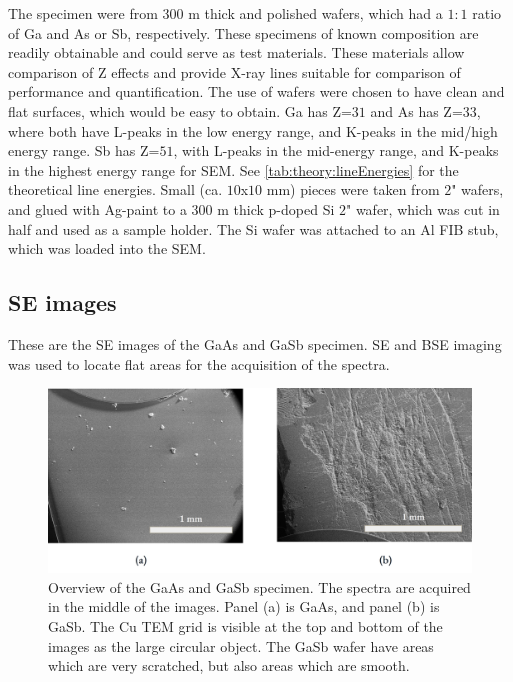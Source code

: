 The specimen were from $300$ \textmu m thick and polished wafers, which had a $1:1$ ratio of Ga and As or Sb, respectively.
These specimens of known composition are readily obtainable and could serve as test materials.
These materials allow comparison of Z effects and provide X-ray lines suitable for comparison of performance and quantification.
The use of wafers were chosen to have clean and flat surfaces, which would be easy to obtain.
Ga has Z=$31$ and As has Z=$33$, where both have L-peaks in the low energy range, and K-peaks in the mid/high energy range.
Sb has Z=$51$, with L-peaks in the mid-energy range, and K-peaks in the highest energy range for SEM.
See \cref{tab:theory:lineEnergies} for the theoretical line energies.
Small (ca. $10$x$10$ mm) pieces were taken from $2$" wafers, and glued with Ag-paint to a $300$ \textmu m thick p-doped Si $2$" wafer, which was cut in half and used as a sample holder.
The Si wafer was attached to an Al FIB stub, which was loaded into the SEM.




\subsection{SE images}
\label{method:SE_images}

These are the SE images of the GaAs and GaSb specimen.
SE and BSE imaging was used to locate flat areas for the acquisition of the spectra.

\begin{figure}[htbp]
    \centering
    \includegraphics[width=.95\textwidth]{figures/SE_images/Overview_GaAs_GaSb.jpg}
    \caption{
        Overview of the GaAs and GaSb specimen.
        The spectra are acquired in the middle of the images.
        Panel (a) is GaAs, and panel (b) is GaSb.
        The Cu TEM grid is visible at the top and bottom of the images as the large circular object.
        The GaSb wafer have areas which are very scratched, but also areas which are smooth.
    }
    \label{fig:SE_images:Overview_GaAs_GaSb}
\end{figure}

